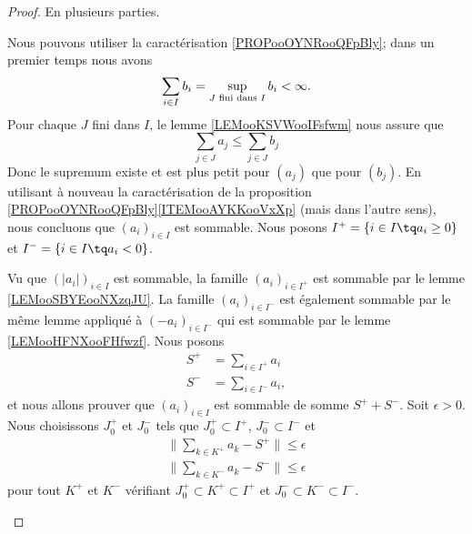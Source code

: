 \begin{proof}
    En plusieurs parties.
    \begin{subproof}
        Nous pouvons utiliser la caractérisation \ref{PROPooOYNRooQFpBly}; dans un premier temps nous avons
        \begin{equation}
            \sum_{i\in I}b_i=\sup_{\text{\( J\) fini dans \( I\)}}b_i<\infty.
        \end{equation}
        Pour chaque \( J\) fini dans \( I\), le lemme \ref{LEMooKSVWooIFsfwm} nous assure que
        \begin{equation}
            \sum_{j\in J}a_j\leq \sum_{j\in J}b_j
        \end{equation}
        Donc le supremum existe et est plus petit pour \( (a_j)\) que pour \( (b_j)\). En utilisant à nouveau la caractérisation de la proposition \ref{PROPooOYNRooQFpBly}\ref{ITEMooAYKKooVxXp} (mais dans l'autre sens), nous concluons que \( (a_i)_{i\in I}\) est sommable.
        Nous posons \( I^+=\{ i\in I\tq a_i\geq 0 \}\) et \( I^-=\{ i\in I\tq a_i<0 \}\).

        Vu que \( (| a_i |)_{i\in I}\) est sommable, la famille \( (a_i)_{i\in I^+}\) est sommable par le lemme \ref{LEMooSBYEooNXzqJU}. La famille \( (a_i)_{i\in I^-}\) est également sommable par le même lemme appliqué à \( (-a_i)_{i\in I^-}\) qui est sommable par le lemme \ref{LEMooHFNXooFHfwzf}. Nous posons
        \begin{subequations}
            \begin{align}
                S^+&=\sum_{i\in I^+}a_i\\
                S^-&=\sum_{i\in I^-}a_i,
            \end{align}
        \end{subequations}
        et nous allons prouver que \( (a_i)_{i\in I}\) est sommable de somme \( S^++S^-\). Soit \( \epsilon>0\). Nous choisissons \( J_0^+\) et \( J_0^-\) tels que \( J_0^+\subset I^+\), \( J_0^-\subset I^-\) et
        \begin{subequations}
            \begin{align}
                \| \sum_{k\in K^+}a_k- S^+ \|\leq \epsilon\\
                \| \sum_{k\in K^-}a_k- S^- \|\leq \epsilon
            \end{align}
        \end{subequations}
        pour tout \( K^+\) et \( K^-\) vérifiant \( J_0^+\subset K^+\subset I^+\) et \( J_0^-\subset K^-\subset I^-\).


\end{subproof}
\end{proof}
